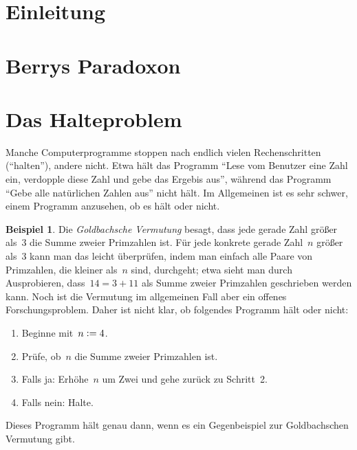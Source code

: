 \documentclass[twoside]{../zirkelblatt1415}
\theoremstyle{definition}
\newtheorem{bsp}[defn]{Beispiel}
\theoremstyle{plain}
\theoremstyle{remark}
\newenvironment{listing}{
  \renewcommand*\theenumi{\arabic{enumi}}
  \renewcommand{\labelenumi}{\theenumi.}
  \begin{enumerate}\itemsep0em}{\end{enumerate}}
\newcommand{\defeq}{\vcentcolon=}
\begin{document}

{\renewcommand{\addvspace}[1]{\vskip0.6em}
\tableofcontents%
}

\section{Einleitung}


\section{Berrys Paradoxon}


\section{Das Halteproblem}

Manche Computerprogramme stoppen nach endlich vielen Rechenschritten
("`halten"'), andere nicht. Etwa hält das Programm "`Lese vom Benutzer eine
Zahl ein, verdopple diese Zahl und gebe das Ergebis aus"', während das Programm
"`Gebe alle natürlichen Zahlen aus"' nicht hält. Im Allgemeinen ist es sehr
schwer, einem Programm anzusehen, ob es hält oder nicht.

\begin{bsp}\label{bsp:unklares-programm1}Die \emph{Goldbachsche Vermutung}
besagt, dass jede gerade Zahl
größer als~3 die Summe zweier Primzahlen ist. Für jede
konkrete gerade Zahl~$n$ größer als~3 kann man das leicht überprüfen, indem man
einfach alle Paare von Primzahlen, die kleiner als~$n$ sind, durchgeht; etwa
sieht man durch Ausprobieren, dass~$14 = 3 + 11$ als Summe zweier Primzahlen
geschrieben werden kann. Noch ist die Vermutung im allgemeinen Fall aber ein
offenes Forschungsproblem. Daher ist nicht klar, ob folgendes Programm hält
oder nicht:
\begin{listing}
\item[1.] Beginne mit~$n \defeq 4$.
\item[2.] Prüfe, ob~$n$ die Summe zweier Primzahlen ist.
\item[3.] Falls ja: Erhöhe~$n$ um Zwei und gehe zurück zu Schritt~2.
\item[4.] Falls nein: Halte.
\end{listing}
Dieses Programm hält genau dann, wenn es ein Gegenbeispiel zur Goldbachschen
Vermutung gibt.
\end{bsp}
\end{document}
